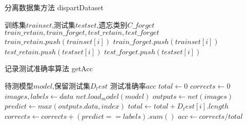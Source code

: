 \begin{algorithm}
	\renewcommand{\algorithmicrequire}{\textbf{Input:}}
	\renewcommand{\algorithmicensure}{\textbf{Output:}}
	\caption{分离数据集方法  dispartDataset}
	\label{algorithm:dispartDataset}
	\begin{algorithmic}[1]
        \REQUIRE 训练集$trainset$,测试集$testset$,遗忘类别$C\_forget$
        \ENSURE  $train\_retain,train\_forget,test\_retain,test\_forget$
                \STATE $ train\_retain.push(trainset[i])$
            \ELSE
                \STATE $ train\_forget.push(trainset[i])$
            \ENDIF
                \STATE $ test\_retain.push(testset[i])$
            \ELSE
                \STATE $ test\_forget.push(testset[i])$
            \ENDIF
        \ENDFOR
	\end{algorithmic}  
\end{algorithm}

\begin{algorithm}
	\renewcommand{\algorithmicrequire}{\textbf{Input:}}
	\renewcommand{\algorithmicensure}{\textbf{Output:}}
	\caption{记录测试准确率算法  getAcc}
	\label{algorithm:getAcc}
	\begin{algorithmic}[1]
        \REQUIRE 待测模型$model$,保留测试集$D_test$
        \ENSURE  测试准确率$acc$
        \STATE $total \gets 0$
        \STATE $corrects \gets 0$
            \STATE $images, labels \gets data$
            \STATE $net.load_model(model)$
            \STATE $outputs \gets net(images)$
            \STATE $predict \gets max(outputs.data, index)$
            \STATE $total \gets total + D_test[i].length$
            \STATE $corrects \gets corrects + (predict == labels).sum()$
        \ENDFOR
        \STATE $acc \gets corrects / total$
	\end{algorithmic}  
\end{algorithm}

